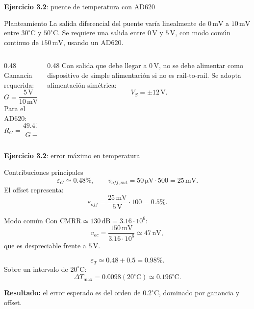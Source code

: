 \documentclass[aspectratio=169,9pt]{beamer}
\newcommand{\exercise}[1]{\textbf{Ejercicio #1}}
\newcommand{\result}[1]{\textbf{\color{eiTeal}Resultado:} #1}
\newcommand{\unit}[1]{\,\mathrm{#1}}
\newcommand{\CMRR}{\mathrm{CMRR}}
\begin{document}
\begin{frame}{\exercise{3.2}: puente de temperatura con AD620}
  \begin{block}{Planteamiento}
    La salida diferencial del puente varía linealmente de \(0\unit{mV}\) a \(10\unit{mV}\) entre \(30^\circ\mathrm{C}\) y \(50^\circ\mathrm{C}\). Se requiere una salida entre \(0\unit{V}\) y \(5\unit{V}\), con modo común continuo de \(150\unit{mV}\), usando un AD620.
  \end{block}

  \begin{columns}[T,onlytextwidth]
    \begin{column}{0.48\textwidth}
      Ganancia requerida:
      \[
        G=\frac{5\unit{V}}{10\unit{mV}}=500.
      \]
      Para el AD620:
      \[
        R_G=\frac{49.4\unit{k\Omega}}{G-1}\simeq 100\unit{\Omega}.
      \]
    \end{column}
    \begin{column}{0.48\textwidth}
      Con salida que debe llegar a \(0\unit{V}\), no se debe alimentar como dispositivo de simple alimentación si no es rail-to-rail. Se adopta alimentación simétrica:
      \[
        V_S=\pm 12\unit{V}.
      \]
    \end{column}
  \end{columns}
\end{frame}

\begin{frame}[shrink=20]{\exercise{3.2}: error máximo en temperatura}
  \begin{block}{Contribuciones principales}
    \[
      \varepsilon_G\simeq 0.48\%,\qquad
      v_{off,out}=50\unit{\mu V}\cdot 500=25\unit{mV}.
    \]
    El offset representa:
    \[
      \varepsilon_{off}=\frac{25\unit{mV}}{5\unit{V}}\cdot100=0.5\%.
    \]
  \end{block}

  \begin{block}{Modo común}
    Con \(\CMRR\simeq 130\unit{dB}=3.16\cdot 10^6\):
    \[
      v_{oc}=\frac{150\unit{mV}}{3.16\cdot10^6}\simeq 47\unit{nV},
    \]
    que es despreciable frente a \(5\unit{V}\).
  \end{block}

  \[
    \varepsilon_T\simeq 0.48+0.5=0.98\%.
  \]
  Sobre un intervalo de \(20^\circ\mathrm{C}\):
  \[
    \Delta T_{\max}=0.0098(20^\circ\mathrm{C})\simeq 0.196^\circ\mathrm{C}.
  \]

  \result{el error esperado es del orden de \(0.2^\circ\mathrm{C}\), dominado por ganancia y offset.}
\end{frame}
\end{document}
